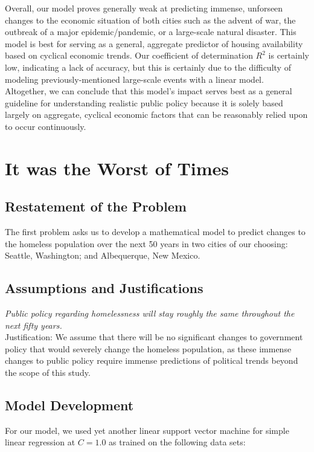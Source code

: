 \documentclass[12pt]{article}
\begin{document}
Overall, our model proves generally weak at predicting immense, unforseen changes to the economic situation of both cities such as the advent of war, the outbreak of a major epidemic/pandemic, or a large-scale natural disaster. This model is best for serving as a general, aggregate predictor of housing availability based on cyclical economic trends. Our coefficient of determination $R^{2}$ is certainly low, indicating a lack of accuracy, but this is certainly due to the difficulty of modeling previously-mentioned large-scale events with a linear model. \\ 

\noindent
Altogether, we can conclude that this model's impact serves best as a general guideline for understanding realistic public policy because it is solely based largely on aggregate, cyclical economic factors that can be reasonably relied upon to occur continuously.

\newpage

\section{It was the Worst of Times}

\subsection{Restatement of the Problem}
The first problem asks us to develop a mathematical model to predict changes to the homeless population over the next 50
years in two cities of our choosing: Seattle, Washington; and Albequerque, New Mexico.

\subsection{Assumptions and Justifications}
\textit{Public policy regarding homelessness will stay roughly the same throughout the next fifty years.} \\

\noindent
Justification: We assume that there will be no significant changes to government policy that would severely change the homeless population, as these immense changes to public policy require immense predictions of political trends beyond the scope of this study. \\

\subsection{Model Development}
For our model, we used yet another linear support vector machine for simple linear regression at $C=1.0$ as trained on the following data sets:
\end{document}

